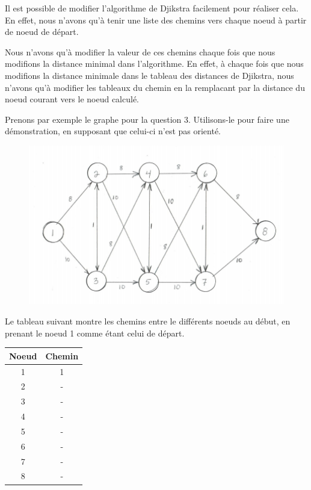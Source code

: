 \documentclass[12pt]{article}
\begin{document}
Il est possible de modifier l'algorithme de Djikstra facilement pour réaliser cela. En effet, nous n'avons qu'à tenir une liste des chemins vers chaque noeud à partir de noeud de départ. \newline

Nous n'avons qu'à modifier la valeur de ces chemins chaque fois que nous modifions la distance minimal dans l'algorithme. En effet, à chaque fois que nous modifions la distance minimale dans le tableau des distances de Djikstra, nous n'avons qu'à modifier les tableaux du chemin en la remplacant par la distance du noeud courant vers le noeud calculé. \newline

Prenons par exemple le graphe pour la question 3. Utilisons-le pour faire une démonstration, en supposant que celui-ci n'est pas orienté.

\begin{figure}[H]
	\centering
	\includegraphics[width=12cm]{figures/q3}
\end{figure}

Le tableau suivant montre les chemins entre le différents noeuds au début, en prenant le noeud 1 comme étant celui de départ.

\begin{center}
	\begin{tabular}{||c c||}
		\hline
		Noeud & Chemin \\ [0.5ex]
		\hline\hline
		1 & 1 \\
		\hline
		2 & - \\
		\hline
		3 & - \\
		\hline
		4 & - \\
		\hline
		5 & -  \\
		\hline
		6 & -  \\
		\hline
		7 & -  \\
		\hline
		8 & -  \\ [1ex]
		\hline
	\end{tabular}
\end{center}
\end{document}
